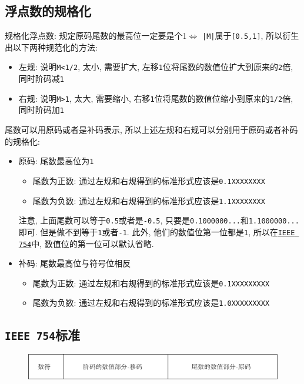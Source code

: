 \subsection{浮点数的规格化}
规格化浮点数: 规定原码尾数的最高位一定要是个1$ \Leftrightarrow $ \texttt{|M|}属于\verb|[0.5,1]|, 所以衍生出以下两种规范化的方法:
\begin{itemize}
\item 左规: 说明\texttt{M<1/2}, 太小, 需要扩大, 左移\verb|1|位将尾数的数值位扩大到原来的\verb|2|倍, 同时阶码减\verb|1|
\item 右规: 说明\texttt{M>1}, 太大, 需要缩小, 右移\verb|1|位将尾数的数值位缩小到原来的\verb|1/2|倍, 同时阶码加\verb|1|
\end{itemize}\par
尾数可以用原码或者是补码表示, 所以上述左规和右规可以分别用于原码或者补码的规格化:
\begin{itemize}
\item 原码: 尾数最高位为\verb|1|
\begin{itemize}
\item 尾数为正数: 通过左规和右规得到的标准形式应该是\verb|0.1XXXXXXXX|
\item 尾数为负数: 通过左规和右规得到的标准形式应该是\verb|1.1XXXXXXXX|
\end{itemize}\par
注意, 上面尾数可以等于\verb|0.5|或者是\verb|-0.5|, 只要是\verb|0.1000000...|和\verb|1.1000000...|即可. 但是做不到等于\verb|1|或者\verb|-1|. 此外, 他们的数值位第一位都是\verb|1|, 所以在\hyperref[IEEE 754]{\texttt{IEEE 754}}中, 数值位的第一位可以默认省略.
\item 补码: 尾数最高位与符号位相反
\begin{itemize}
\item 尾数为正数: 通过左规和右规得到的标准形式应该是\verb|0.1XXXXXXXXX|
\item 尾数为负数: 通过左规和右规得到的标准形式应该是\verb|1.0XXXXXXXXX|
\end{itemize}
\end{itemize}
\subsection{\texttt{IEEE 754}标准}\label{IEEE 754} %
\begin{figure}[H]
\centering
\includegraphics[scale=.5]{img/figure10.pdf}
\end{figure}
